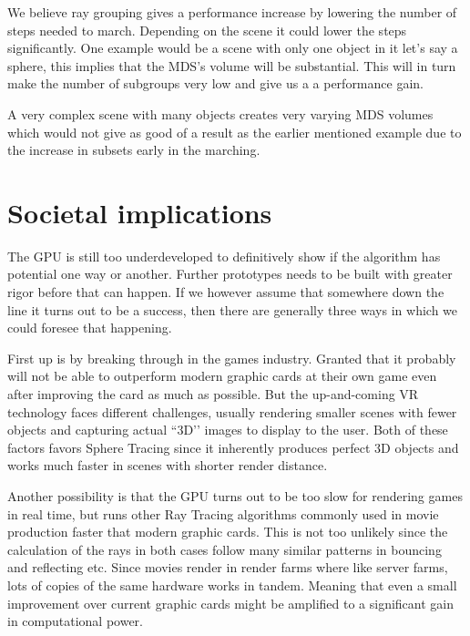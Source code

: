 			We believe ray grouping gives a performance increase by lowering
			the number of steps needed to march. Depending on the scene it
			could lower the steps significantly. One example would be a scene
			with only one object in it let's say a sphere, this implies that
			the MDS's volume will be substantial. This will in turn make the
			number of subgroups very low and give us a a performance gain. 
			
			A very complex scene with many objects creates very varying MDS
			volumes which would not give as good of a result as the earlier
			mentioned example due to the increase in subsets early in the
			marching.

	\section{Societal implications} %

		
		The GPU is still too underdeveloped
		to definitively show if the algorithm has potential one way or another.
		Further prototypes needs to be built with greater rigor before that can
		happen. If we however assume that somewhere down the line it turns out
		to be a success, then there are generally three ways in which we could
		foresee that happening.

		First up is by breaking through in the games industry. Granted that it
		probably will not be able to outperform modern graphic cards at their own
		game even after improving the card as much as possible. But the
		up-and-coming VR technology faces different challenges, usually rendering
		smaller scenes with fewer objects and capturing actual ``3D’’ images to
		display to the user. Both of these factors favors Sphere Tracing since it
		inherently produces perfect 3D objects and works much faster in scenes with
		shorter render distance.

		Another possibility is that the GPU turns out to be too slow for
		rendering games in real time, but runs other Ray Tracing algorithms
		commonly used in movie production faster that modern graphic cards.
		This is not too unlikely since the calculation of the rays in both
		cases follow many similar patterns in bouncing and reflecting etc.
		Since movies render in render farms where like server farms, lots of
		copies of the same hardware works in tandem. Meaning that even a small
		improvement over current graphic cards might be amplified to a
		significant gain in computational power.

